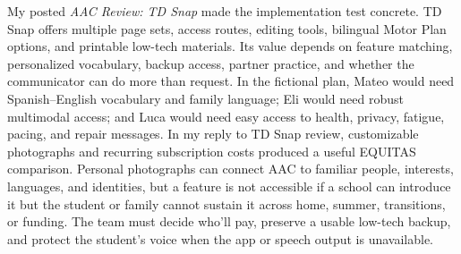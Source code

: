 My posted \textit{AAC Review: TD Snap} made the implementation test concrete. TD Snap offers multiple page sets, access routes, editing tools, bilingual Motor Plan options, and printable low-tech materials. Its value depends on feature matching, personalized vocabulary, backup access, partner practice, and whether the communicator can do more than request. In the fictional plan, Mateo would need Spanish--English vocabulary and family language; Eli would need robust multimodal access; and Luca would need easy access to health, privacy, fatigue, pacing, and repair messages. In my reply to TD Snap review, customizable photographs and recurring subscription costs produced a useful EQUITAS comparison. Personal photographs can connect AAC to familiar people, interests, languages, and identities, but a feature is not accessible if a school can introduce it but the student or family cannot sustain it across home, summer, transitions, or funding. The team must decide who'll pay, preserve a usable low-tech backup, and protect the student's voice when the app or speech output is unavailable.

